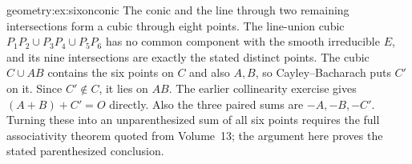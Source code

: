 \begin{solution}{geometry:ex:sixonconic}
\idea The conic and the line through two remaining intersections form a cubic through eight points.
\writeup The line-union cubic $P_1P_2\cup P_3P_4\cup P_5P_6$ has no common component with the smooth irreducible $E$, and its nine intersections are exactly the stated distinct points. The cubic $C\cup AB$ contains the six points on $C$ and also $A,B$, so Cayley--Bacharach puts $C'$ on it. Since $C'\notin C$, it lies on $AB$. The earlier collinearity exercise gives $(A+B)+C'=O$ directly. Also the three paired sums are $-A,-B,-C'$. Turning these into an unparenthesized sum of all six points requires the full associativity theorem quoted from Volume~13; the argument here proves the stated parenthesized conclusion.
\end{solution}

